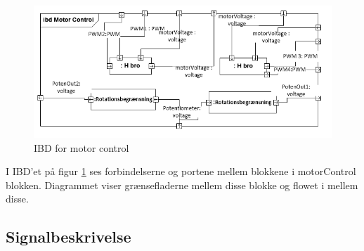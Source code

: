 \begin{figure}[H]
	\centering
	\includegraphics[width= \textwidth]{Systemarkitektur/images/IBDmotorcontrol2}
	\caption{IBD for motor control}
	\label{fig:IBDm}
\end{figure}
I IBD'et på figur \ref{fig:IBDm} ses forbindelserne og portene mellem blokkene i motorControl blokken. Diagrammet viser grænsefladerne mellem disse blokke og flowet i mellem disse.

\subsection{Signalbeskrivelse}

